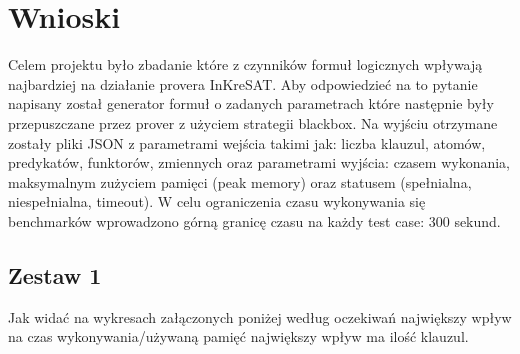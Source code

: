 \documentclass[a4paper,12pt]{article}
\begin{document}
%
\section{Wnioski}

Celem projektu było zbadanie które z czynników formuł logicznych wpływają najbardziej na działanie provera InKreSAT. Aby odpowiedzieć na to pytanie napisany został generator formuł o zadanych parametrach które następnie były przepuszczane przez prover z użyciem strategii blackbox. Na wyjściu otrzymane zostały pliki JSON z parametrami wejścia takimi jak: liczba klauzul, atomów, predykatów, funktorów, zmiennych oraz parametrami wyjścia: czasem wykonania, maksymalnym zużyciem pamięci (peak memory) oraz statusem (spełnialna, niespełnialna, timeout). W celu ograniczenia czasu wykonywania się benchmarków wprowadzono górną granicę czasu na każdy test case: 300 sekund.

\subsection{Zestaw 1}

Jak widać na wykresach załączonych poniżej według oczekiwań największy wpływ na czas wykonywania/używaną pamięć największy wpływ ma ilość klauzul.


\end{document}
